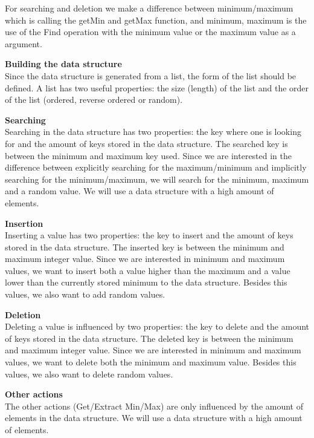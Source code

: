 \documentclass{article}
\begin{document}
For searching and deletion we make a difference between minimum/maximum which is calling the getMin and getMax function, and minimum, maximum is the use of the Find operation with the minimum value or the maximum value as a argument.  

\textbf{Building the data structure }\\
Since the data structure is generated from a list, the form of the list should be defined. A list has two useful properties: the size (length) of the list and the order of the list (ordered, reverse ordered or random).

\textbf{Searching }\\
Searching in the data structure has two properties: the key where one is looking for and the amount of keys stored in the data structure. The searched key is between the minimum and maximum key used. Since we are interested in the difference between explicitly searching for the maximum/minimum and implicitly searching for the minimum/maximum, we will search for the minimum, maximum and a random value. We will use a data structure with a high amount of elements. 

\textbf{Insertion}\\
Inserting a value has two properties: the key to insert and the amount of keys stored in the data structure. The inserted key is between the minimum and maximum integer value. Since we are interested in minimum and maximum values, we want to insert both a value higher than the maximum and a value lower than the currently stored minimum to the data structure.  Besides this values, we also want to add random values.

\textbf{Deletion}\\
Deleting a value is influenced by two properties: the key to delete and the amount of keys stored in the data structure. The deleted key is between the minimum and maximum integer value. Since we are interested in minimum and maximum values, we want to delete both the minimum and maximum value. Besides this values, we also want to delete random values.

\textbf{Other actions}\\
The other actions (Get/Extract Min/Max) are only influenced by the amount of elements in the data structure. We will use a data structure with a high amount of elements.
\end{document}
